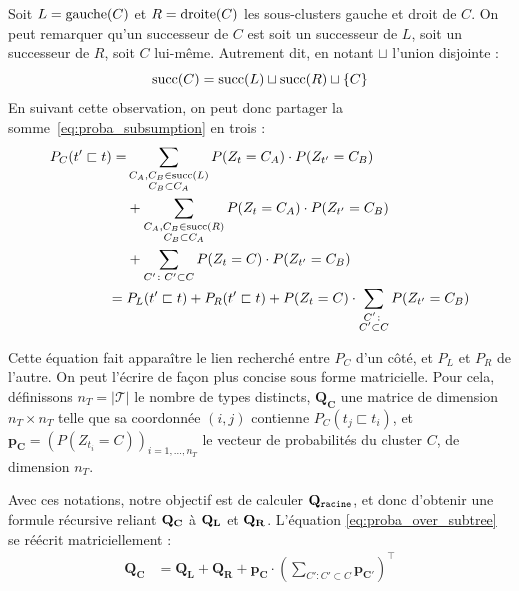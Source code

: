 Soit $L = \gauche(C)$ et $R = \droite(C)$ les sous-clusters gauche et droit de $C$. On peut remarquer qu'un successeur de $C$ est soit un successeur de $L$, soit un successeur de $R$, soit $C$ lui-même. Autrement dit, en notant $\sqcup$ l'union disjointe :
\begin{equation}
    \succs(C) = \succs(L) \sqcup \succs(R) \sqcup \{ C\}
\end{equation}
En suivant cette observation, on peut donc partager la somme~\ref{eq:proba_subsumption} en trois :
\begin{align}
P_{C}(t' \sqsubset t) = 
&
\sum_{\substack{C_A, C_B \in \succs(L) \\  C_B \subset C_A}} P(Z_t = C_A)\cdot P(Z_{t'} = C_B) 
\nonumber \\ 
&+ 
\sum_{\substack{C_A, C_B \in \succs(R) \\  C_B \subset C_A}} P(Z_t = C_A)\cdot P(Z_{t'} = C_B) 
\nonumber \\
&+ \displaystyle \sum_{C' \colon C' \subset C} P(Z_t = C) \cdot P(Z_{t'} = C_B) \nonumber \\
= {} & P_{L}(t' \sqsubset t) + P_{R}(t' \sqsubset t)  + P(Z_t=C)\cdot\sum_{\substack{C' \colon \\ C' \subset C}} P(Z_{t'} = C_B)
\label{eq:proba_over_subtree}
\end{align}

Cette équation fait apparaître le lien recherché entre $P_C$ d'un côté, et $P_L$ et $P_R$ de l'autre. On peut l'écrire de façon plus concise sous forme matricielle. Pour cela, définissons $n_T = | \mathcal{T} |$ le nombre de types distincts, $\mathbf{Q_C}$ une matrice de dimension $n_T \times n_T$ telle que sa coordonnée $(i, j)$ contienne $P_C(t_j \sqsubset t_i)$, et $\mathbf{p_C} = \left(P(Z_{t_i} = C)\right)_{i = 1, \ldots, n_T}$ le vecteur de probabilités du cluster $C$, de dimension $n_T$. 

Avec ces notations, notre objectif est de calculer $\bf{Q_\texttt{racine}}$, et donc d'obtenir une formule récursive reliant $\bf{Q_C}$ à $\bf{Q_L}$ et $\bf{Q_R}$. L'équation \ref{eq:proba_over_subtree} se réécrit matriciellement :
\begin{align}
    \mathbf{Q_C} &= \mathbf{Q_L} + \mathbf{Q_R} + \mathbf{p_C} \cdot \left(\sum_{C' \colon C' \subset C} \mathbf{p_{C'}} \right)^\top 
    \label{eq:recursive_q_formula}
\end{align}


